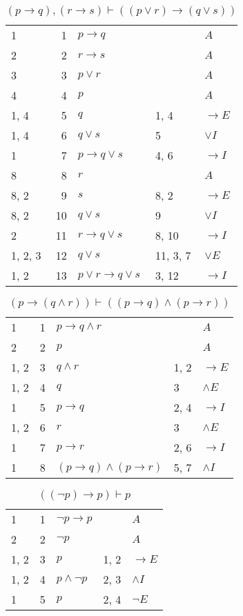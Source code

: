 \documentclass{article}
\begin{document}
\begin{table}[htbp]\caption*{$(p→q),(r→s) ⊢ ((p∨r)→(q∨s))$}\centering\begin{tabular}{lrlll}
{1} & 1 & $p→q$ & {} & $A$ \\
{2} & 2 & $r→s$ & {} & $A$ \\
{3} & 3 & $p∨r$ & {} & $A$ \\
{4} & 4 & $p$ & {} & $A$ \\
{1, 4} & 5 & $q$ & {1, 4} & $→E$ \\
{1, 4} & 6 & $q∨s$ & {5} & $∨I$ \\
{1} & 7 & $p→q∨s$ & {4, 6} & $→I$ \\
{8} & 8 & $r$ & {} & $A$ \\
{8, 2} & 9 & $s$ & {8, 2} & $→E$ \\
{8, 2} & 10 & $q∨s$ & {9} & $∨I$ \\
{2} & 11 & $r→q∨s$ & {8, 10} & $→I$ \\
{1, 2, 3} & 12 & $q∨s$ & {11, 3, 7} & $∨E$ \\
{1, 2} & 13 & $p∨r→q∨s$ & {3, 12} & $→I$ \\
\end{tabular}
\end{table}
\begin{table}[htbp]\caption*{$(p→(q∧r)) ⊢ ((p→q)∧(p→r))$}\centering\begin{tabular}{lrlll}
{1} & 1 & $p→q∧r$ & {} & $A$ \\
{2} & 2 & $p$ & {} & $A$ \\
{1, 2} & 3 & $q∧r$ & {1, 2} & $→E$ \\
{1, 2} & 4 & $q$ & {3} & $∧E$ \\
{1} & 5 & $p→q$ & {2, 4} & $→I$ \\
{1, 2} & 6 & $r$ & {3} & $∧E$ \\
{1} & 7 & $p→r$ & {2, 6} & $→I$ \\
{1} & 8 & $(p→q)∧(p→r)$ & {5, 7} & $∧I$ \\
\end{tabular}
\end{table}
\begin{table}[htbp]\caption*{$((¬p)→p) ⊢ p$}\centering\begin{tabular}{lrlll}
{1} & 1 & $¬p→p$ & {} & $A$ \\
{2} & 2 & $¬p$ & {} & $A$ \\
{1, 2} & 3 & $p$ & {1, 2} & $→E$ \\
{1, 2} & 4 & $p∧ ¬p$ & {2, 3} & $∧I$ \\
{1} & 5 & $p$ & {2, 4} & $¬E$ \\
\end{tabular}
\end{table}
\end{document}
